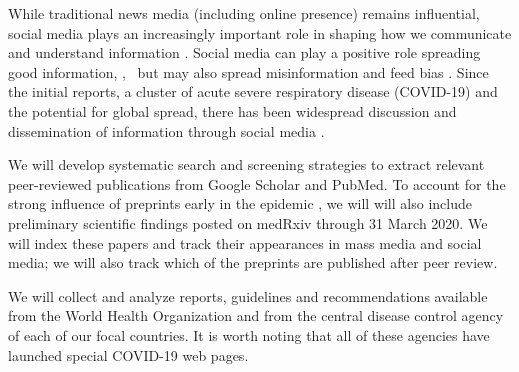While traditional news media (including online presence) remains influential,  social media plays an increasingly important role in shaping how we communicate and understand information \citep{LiuSieg19}. Social media can play a positive role spreading good information, \cite{BascHill20, SunYang20,AhmeQuin18},  but may also spread misinformation and feed bias \citep{ChouOhA18, McKevanS19}.
Since the initial reports, a cluster of acute severe respiratory disease (COVID-19) and the potential for global spread, there has been widespread discussion and dissemination of information through social media \citep{?}.






 We will develop systematic search and screening strategies to extract relevant peer-reviewed publications from Google Scholar and PubMed. To account for the strong influence of preprints early in the epidemic \cite{MajuMandPRE}, we will will also include preliminary scientific findings posted on medRxiv through 31 March 2020. We will index these papers and track their appearances in mass media and social media; we will also track which of the preprints are published after peer review.

 We will collect and analyze reports, guidelines and recommendations available from the World Health Organization and from the central disease control agency of each of our focal countries. It is worth noting that all of these agencies have launched special COVID-19 web pages.


